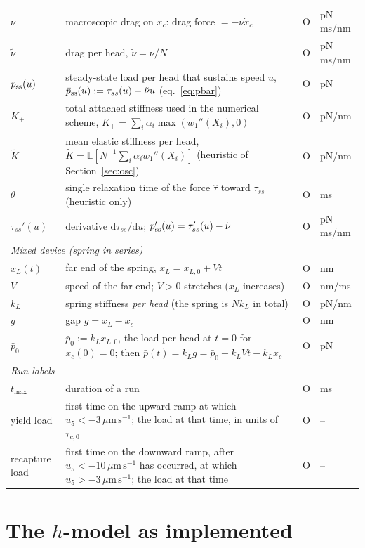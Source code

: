 \documentclass[11pt,a4paper]{article}
\newcommand{\dd}{\mathrm{d}}
\newcommand{\umps}{\,\mu\mathrm{m\,s^{-1}}}
\newcommand{\tauz}{\tau_{c,0}}
\newcommand{\pss}{\bar p_{\rm ss}}
\begin{document}
{\begin{longtable}{p{2.5cm}p{8.5cm}p{1.0cm}p{1.9cm}}
$\nu$ & macroscopic drag on $x_c$: drag force $=-\nu\dot x_c$ & O & pN\,ms/nm\\
$\tilde\nu$ & drag per head, $\tilde\nu=\nu/N$ & O & pN\,ms/nm\\
$\pss(u)$ & steady-state load per head that sustains speed $u$, $\pss(u):=\tau_{ss}(u)-\tilde\nu u$ (eq.~\eqref{eq:pbar}) & O & pN\\
$K_+$ & total attached stiffness used in the numerical scheme, $K_+=\sum_i\alpha_i\max(w_1''(X_i),0)$ & O & pN/nm\\
$\tilde K$ & mean elastic stiffness per head, $\tilde K=\mathbb E[N^{-1}\sum_i\alpha_iw_1''(X_i)]$ (heuristic of Section~\ref{sec:osc}) & O & pN/nm\\
$\theta$ & single relaxation time of the force $\hat\tau$ toward $\tau_{ss}$ (heuristic only) & O & ms\\
$\tau_{ss}'(u)$ & derivative $\dd\tau_{ss}/\dd u$; $\pss'(u)=\tau_{ss}'(u)-\tilde\nu$ & O & pN\,ms/nm\\
\midrule
\multicolumn{4}{l}{\emph{Mixed device (spring in series)}}\\
$x_L(t)$ & far end of the spring, $x_L=x_{L,0}+Vt$ & O & nm\\
$V$ & speed of the far end; $V>0$ stretches ($x_L$ increases) & O & nm/ms\\
$k_L$ & spring stiffness \emph{per head} (the spring is $Nk_L$ in total) & O & pN/nm\\
$g$ & gap $g=x_L-x_c$ & O & nm\\
$\bar p_0$ & $\bar p_0:=k_Lx_{L,0}$, the load per head at $t=0$ for $x_c(0)=0$; then $\bar p(t)=k_Lg=\bar p_0+k_LVt-k_Lx_c$ & O & pN\\
\midrule
\multicolumn{4}{l}{\emph{Run labels}}\\
$t_{\max}$ & duration of a run & O & ms\\
yield load & first time on the upward ramp at which $u_5<-3\umps$; the load at that time, in units of $\tauz$ & O & --\\
recapture load & first time on the downward ramp, after $u_5<-10\umps$ has occurred, at which $u_5>-3\umps$; the load at that time & O & --\\
\bottomrule
\end{longtable}
}

\section{The $h$-model as implemented}
\label{sec:model}
\end{document}

